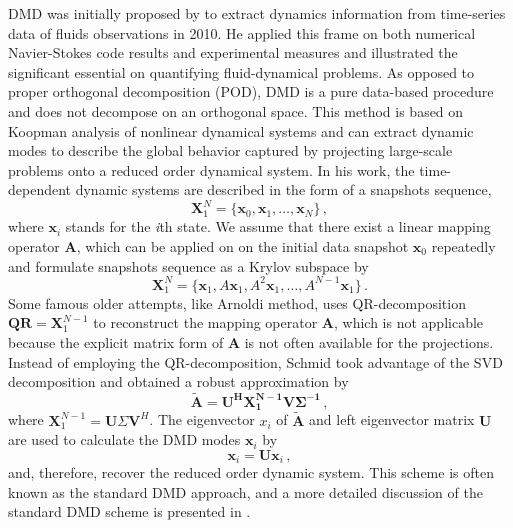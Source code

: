 DMD was initially proposed by \citet{schmid_dynamic_2010}\cite{schmid_applications_2011} to extract dynamics information from time-series data of fluids observations in 2010.
He applied this frame on both numerical Navier-Stokes code results and experimental measures and illustrated the significant essential on quantifying fluid-dynamical problems.
As opposed to proper orthogonal decomposition (POD)\cite{lumley2007stochastic}, DMD is a pure data-based procedure and does not decompose on an orthogonal space. 
This method is based on Koopman analysis\cite{lasota2013chaos,mezic2005spectral} of nonlinear dynamical systems and can extract dynamic modes to describe the global behavior captured by projecting large-scale problems onto a reduced order dynamical system.
In his work, the time-dependent dynamic systems are described in the form of a snapshots sequence,
\begin{equation}
 \mathbf{X}^{N}_1 = \{\mathbf{x}_0, \mathbf{x}_1, \ldots, \mathbf{x}_{N} \} \, ,
 \label{eq:snap_matrix}
\end{equation}
where $\mathbf{x}_i$ stands for the {\it i}th state.
We assume that there exist a linear mapping operator $\mathbf{A}$, which can be applied on on the initial data snapshot $\mathbf{x}_0$ repeatedly and formulate snapshots sequence  as a Krylov subspace by
\begin{equation}
 \mathbf{X}^{N}_1 = \{\mathbf{x}_1,A\mathbf{x}_1,A^2\mathbf{x}_1,…,A^{N-1}\mathbf{x}_1 \} \, .
 \label{eq:Krylov_seq}
\end{equation}
Some famous older attempts, like Arnoldi method\cite{arnoldi1951principle}, uses QR-decomposition $\mathbf{QR} = \mathbf{X}^{N-1}_1$ to reconstruct the mapping operator $\mathbf{A}$, which is not applicable because the explicit matrix form of  $\mathbf{A}$ is not often available for the projections.\cite{Greenbaum_1997, trefethen1997numerical}
Instead of employing the QR-decomposition, Schmid took advantage of the SVD decomposition and obtained a robust approximation by 
\begin{equation}
\mathbf{\tilde{A}} = \mathbf{U^H X_1^{N-1}V\Sigma^{-1}} \, ,
 \label{eq:stanard_DMD}
\end{equation}
where $\mathbf{X}_1^{N-1} = \mathbf{U}\Sigma \mathbf{V}^H$. 
The eigenvector $x_i$ of $\mathbf{\tilde{A}}$ and left eigenvector matrix $\mathbf{U}$ are used to calculate the DMD modes $\mathbf{\mathbf{x}}_i$ by 
\begin{equation}
\mathbf{\mathbf{x}}_i = \mathbf{U} \mathbf{x}_i \, ,
 \label{eq:dyanmic_modes}
\end{equation}
and, therefore, recover the reduced order dynamic system.
This scheme is often known as the standard DMD approach, and a more detailed discussion of the standard DMD scheme is presented in .   

